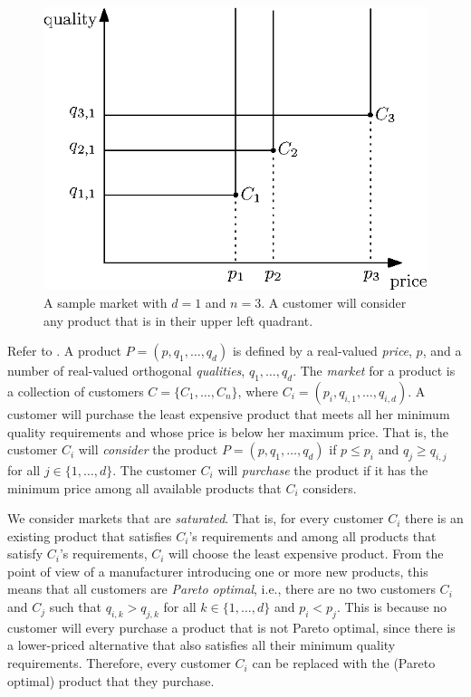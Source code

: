 \documentclass[lotsofwhite]{patmorin}
\begin{document}
\begin{figure}
  \begin{center}
    \includegraphics{intro}
  \end{center}
  \caption{A sample market with $d=1$ and $n=3$. A customer will consider
           any product that is in their upper left quadrant.}
\end{figure}

Refer to .  A product $P=(p,q_1,\ldots,q_d)$ is defined
by a real-valued \emph{price}, $p$, and a number of real-valued
orthogonal \emph{qualities}, $q_1,\ldots,q_d$.  The \emph{market} for
a product is a collection of customers $C=\{C_1,\ldots,C_n\}$, where
$C_i=(p_i,q_{i,1},\ldots,q_{i,d})$.  A customer will purchase the least
expensive product that meets all her minimum quality requirements and
whose price is below her maximum price.  That is, the customer $C_i$
will \emph{consider} the product $P=(p,q_1,\ldots,q_d)$ if $p \le p_i$
and $q_j \ge q_{i,j}$ for all $j\in\{1,\ldots,d\}$.  The customer $C_i$
will \emph{purchase} the product if it has the minimum price among all
available products that $C_i$ considers.

We consider markets that are \emph{saturated}.  That is, for every
customer $C_i$ there is an existing product that satisfies $C_i$'s
requirements and among all products that satisfy $C_i$'s requirements,
$C_i$ will choose the least expensive product.  From the point of
view of a manufacturer introducing one or more new products, this
means that all customers are \emph{Pareto optimal}, i.e., there are
no two customers $C_i$ and $C_j$ such that $q_{i,k} > q_{j,k}$ for all
$k\in\{1,\ldots,d\}$ and $p_i < p_j$.  This is because no customer will
every purchase a product that is not Pareto optimal, since there is a
lower-priced alternative that also satisfies all their minimum quality
requirements. Therefore, every customer $C_i$ can be replaced with the
(Pareto optimal) product that they purchase.
\end{document}
